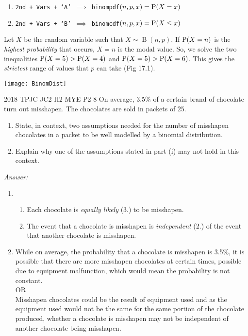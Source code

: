 \documentclass[oneside]{book}
\begin{document}
\begin{GCSkills}{}
  \begin{enumerate}
    \item \texttt{2nd + Vars + `A' \(\implies\) binompdf\((n,p,x)=\operatorname{P}(X=x)\)}
    \item \texttt{2nd + Vars + `B' \(\implies\) binomcdf\((n,p,x)=\operatorname{P}(X\leq x)\)}
  \end{enumerate}
\end{GCSkills}
\begin{note}
  Let \(X\) be the random variable such that \(X \sim \operatorname{B}(n,p)\). If \(\operatorname{P}(X=n)\) is the \emph{highest probability} that occurs, \(X=n\) is the modal value. So, we solve the two inequalities \(\operatorname{P}(X=5)>\operatorname{P}(X=4)\) and \(\operatorname{P}(X=5)>\operatorname{P}(X=6)\). This gives the \emph{strictest} range of values that \(p\) can take (Fig 17.1).
\end{note}
\begin{center}
  \texttt{[image: BinomDist]}
\end{center}
\begin{example}{2018 TPJC JC2 H2 MYE P2 8}{}
  On average, 3.5\% of a certain brand of chocolate turn out misshapen. The chocolates are sold in packets of 25.
  \begin{enumerate}[label=(\roman*)]
    \item State, in context, two assumptions needed for the number of misshapen chocolates in a packet to be well modelled by a binomial distribution.
    \item Explain why one of the assumptions stated in part (i) may not hold in this context.
  \end{enumerate}
  \textit{Answer:}
  \begin{enumerate}[label=(\roman*)]
    \item 
    \begin{enumerate}[label=\arabic*.]
      \item Each chocolate is \emph{equally likely} (3.) to be misshapen.
      \item The event that a chocolate is misshapen is \emph{independent} (2.) of the event that another chocolate is misshapen.
    \end{enumerate}
    \item While on average, the probability that a chocolate is misshapen is 3.5\%, it is possible that there are more misshapen chocolates at certain times, possible due to equipment malfunction, which would mean the probability is not constant.\\[3mm]
    OR\\[3mm]
    Misshapen chocolates could be the result of equipment used and as the equipment used would not be the same for the same portion of the chocolate produced, whether a chocolate is misshapen may not be independent of another chocolate being misshapen.
  \end{enumerate}
\end{example}





\end{document}
